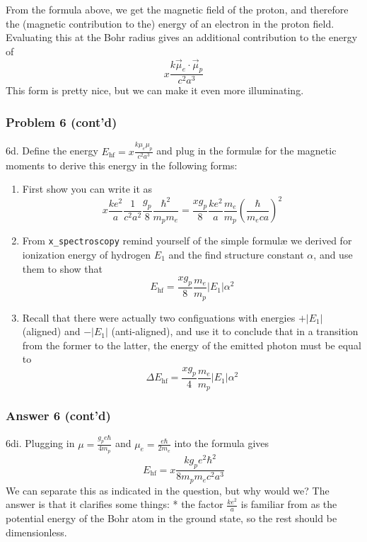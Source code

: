 \documentclass[11pt]{article}
\begin{document}
    From the formula above, we get the magnetic field of the proton, and
therefore the (magnetic contribution to the) energy of an electron in
the proton field. Evaluating this at the Bohr radius gives an additional
contribution to the energy of \[
x \frac{k \vec \mu_e \cdot \vec \mu_p}{c^2 a^3} 
\] This form is pretty nice, but we can make it even more illuminating.

 
\subsubsection{Problem 6 (cont'd)}\label{problem-6-contd}

6d. Define the energy \(E_\textrm{hf}= x \frac{k\mu_e \mu_p}{c^2 a^3}\)
and plug in the formulæ for the magnetic moments to derive this energy
in the following forms:

\begin{enumerate}
\def\labelenumi{\roman{enumi}.}
\item
  First show you can write it as \[
  x \frac{ke^2}{a}\frac1{c^2 a^2} \frac{g_p}{8} \frac{\hbar^2}{m_p m_e} 
  = \frac{x g_p}{8}\frac{ke^2}{a}\frac{m_e}{m_p}\left( \frac {\hbar}{m_e c a} \right)^2
  \]
\item
  From \texttt{x\_spectroscopy} remind yourself of the simple formulæ we
  derived for ionization energy of hydrogen \(E_1\) and the find
  structure constant \(\alpha\), and use them to show that \[
  E_\textrm{hf}
  = \frac{x g_p}{8} \frac{m_e}{m_p} \left|E_1\right| \alpha^2 
  \]
\item
  Recall that there were actually two configuations with energies
  \(+\left|E_1\right|\) (aligned) and \(-\left|E_1\right|\)
  (anti-aligned), and use it to conclude that in a transition from the
  former to the latter, the energy of the emitted photon must be equal
  to \[
  \Delta E_\textrm{hf}
  = \frac{x g_p}{4} \frac{m_e}{m_p} \left|E_1\right| \alpha^2   \tag{6}
  \]
\end{enumerate}
 

     
\subsubsection{Answer 6 (cont'd)}\label{answer-6-contd}

6di. Plugging in \(\mu = \frac{g_pe\hbar}{4m_p}\) and
\(\mu_e = \frac{e\hbar}{2m_e}\) into the formula gives
\[E_\textrm{hf}= x \frac{k g_p e^2\hbar^2}{8 m_p m_e c^2 a^3}\] We can
separate this as indicated in the question, but why would we? The answer
is that it clarifies some things: * the factor \(\frac{ke^2}{a}\) is
familiar from as the potential energy of the Bohr atom in the ground
state, so the rest should be dimensionless.
\end{document}

